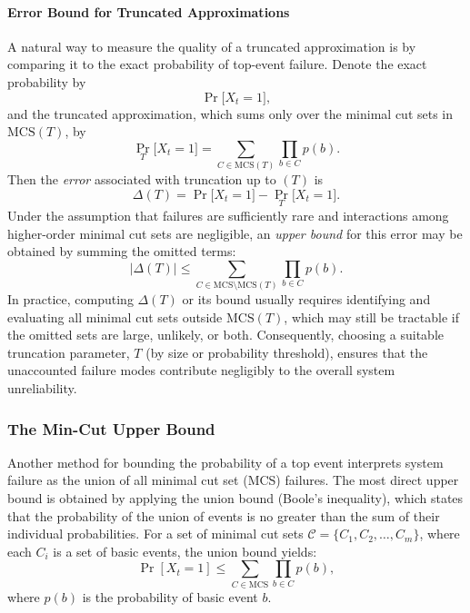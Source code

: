 \paragraph{Error Bound for Truncated Approximations}
A natural way to measure the quality of a truncated approximation is by comparing it to the exact probability of top-event failure. Denote the exact probability by
\[
\Pr\bigl[X_t = 1\bigr],
\]
and the truncated approximation, which sums only over the minimal cut sets in $\mathrm{MCS}(T)$, by
\[
\Pr_{T}\bigl[X_t = 1\bigr]
=
\sum_{C \in \mathrm{MCS}(T)} \prod_{b \in C} p(b).
\]
Then the \emph{error} associated with truncation up to $(T)$ is
\begin{equation}\label{eq:truncation_error_definition}
\Delta(T)
=
\Pr\bigl[X_t = 1\bigr]
-
\Pr_{T}\bigl[X_t = 1\bigr].
\end{equation}
Under the assumption that failures are sufficiently rare and interactions among higher-order minimal cut sets are negligible, an \emph{upper bound} for this error may be obtained by summing the omitted terms:
\begin{equation}\label{eq:truncation_error_bound}
\bigl|\Delta(T)\bigr|
\le
\sum_{C \in \mathrm{MCS}\setminus \mathrm{MCS}(T)}
\prod_{b \in C} p(b).
\end{equation}
In practice, computing $\Delta(T)$ or its bound usually requires identifying and evaluating all minimal cut sets outside $\mathrm{MCS}(T)$, which may still be tractable if the omitted sets are large, unlikely, or both. Consequently, choosing a suitable truncation parameter, $T$ (by size or probability threshold), ensures that the unaccounted failure modes contribute negligibly to the overall system unreliability.

\subsubsection{The Min-Cut Upper Bound}
Another method for bounding the probability of a top event interprets system failure as the union of all minimal cut set (MCS) failures. The most direct upper bound is obtained by applying the union bound (Boole's inequality), which states that the probability of the union of events is no greater than the sum of their individual probabilities. For a set of minimal cut sets $\mathcal{C} = \{C_1, C_2, \ldots, C_m\}$, where each $C_i$ is a set of basic events, the union bound yields:
\begin{equation}
\label{eq:union_bound}
\Pr\left[X_t = 1\right] \leq \sum_{C \in \mathrm{MCS}} \prod_{b \in C} p(b),
\end{equation}
where $p(b)$ is the probability of basic event $b$.

